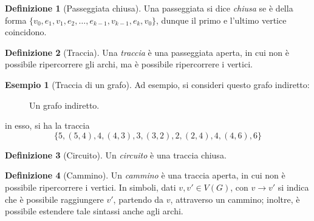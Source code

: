 \documentclass[14pt]{extreport}
\theoremstyle{definition}
\newtheorem{definition}{Definizione}[subsection]
\theoremstyle{definition}
\newtheorem{example}{Esempio}[subsection]
\begin{document}
\begin{definition}[Passeggiata chiusa]
    Una passeggiata si dice \textit{chiusa} se è della forma $\{v_0, e_1, v_1, e_2, \ldots , e_{k - 1}, v_{k - 1}, e_k, v_0\}$, dunque il primo e l'ultimo vertice coincidono. 
\end{definition}

\begin{definition}[Traccia]
    Una \textit{traccia} è una passeggiata aperta, in cui non è possibile ripercorrere gli archi, ma è possibile ripercorrere i vertici.
\end{definition}

\begin{example}[Traccia di un grafo]
    Ad esempio, si consideri questo grafo indiretto:

    \begin{figure}[H]
        \centering
        \caption{Un grafo indiretto.}
    \end{figure}

    in esso, si ha la traccia $$\{5, (5,4), 4, (4,3), 3, (3, 2), 2, (2,4), 4, (4, 6), 6\}$$
\end{example}

\begin{definition}[Circuito]
    Un \textit{circuito} è una traccia chiusa.
\end{definition}

\begin{definition}[Cammino]
    Un \textit{cammino} è una traccia aperta, in cui non è possibile ripercorrere i vertici. In simboli, dati $v, v' \in V(G)$, con $v \rightarrow v'$ si indica che è possibile raggiungere $v'$, partendo da $v$, attraverso un cammino; inoltre, è possibile estendere tale sintassi anche agli archi.
\end{definition}
\end{document}
